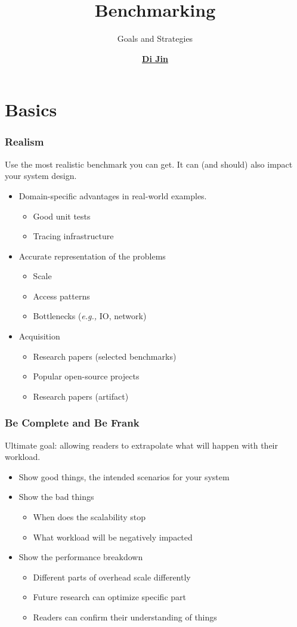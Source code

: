 \documentclass[xcolor={dvipsnames},aspectratio=149]{beamer}
\title[Benchmarking]
{
  Benchmarking
}
\subtitle
{
  Goals and Strategies
}
\author[\href{mailto:di_jin@brown.edu}{Di Jin}]
{
  \href{https://sleepymug.me/}{\textbf{Di Jin}}
}
\date[CSCI2952R]			%
{
}
\def\eg{\emph{e.g.,}\xspace}
\begin{document}
\begin{frame}
\titlepage
\end{frame}

\section{Basics}
\begin{frame}
  \frametitle{Realism}
  Use the most realistic benchmark you can get. It can (and should) also impact your system design.
  \begin{itemize}
  \item Domain-specific advantages in real-world examples.
    \begin{itemize}
    \item Good unit tests
    \item Tracing infrastructure
    \end{itemize}
  \item Accurate representation of the problems
    \begin{itemize}
    \item Scale
    \item Access patterns
    \item Bottlenecks (\eg IO, network)
    \end{itemize}
  \item Acquisition
    \begin{itemize}
    \item Research papers (selected benchmarks)
    \item Popular open-source projects
    \item Research papers (artifact)
    \end{itemize}
  \end{itemize}
\end{frame}

\begin{frame}
  \frametitle{Be Complete and Be Frank}
  Ultimate goal: allowing readers to extrapolate what will happen with their workload.
  \begin{itemize}
  \item Show good things, the intended scenarios for your system
  \item Show the bad things
    \begin{itemize}
    \item When does the scalability stop
    \item What workload will be negatively impacted
    \end{itemize}
  \item Show the performance breakdown
    \begin{itemize}
    \item Different parts of overhead scale differently
    \item Future research can optimize specific part
    \item Readers can confirm their understanding of things
    \end{itemize}
  \end{itemize}
\end{frame}
\end{document}

